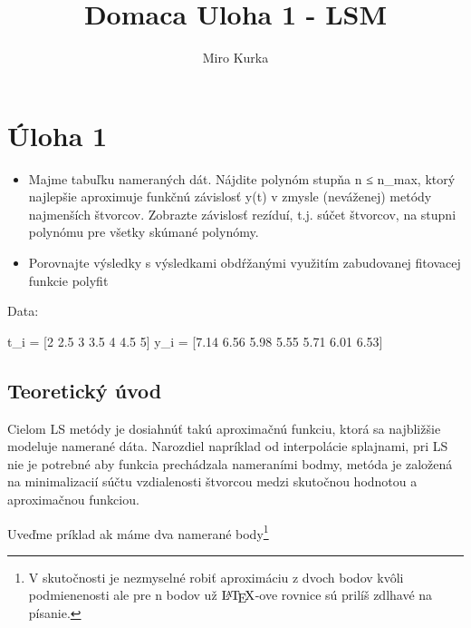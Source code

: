 \documentclass[11pt]{article}
\title{Domaca Uloha 1 - LSM}
\author{Miro Kurka}
\newenvironment{Shaded}{}{}
\newcommand{\DecValTok}[1]{\textcolor[rgb]{0.25,0.63,0.44}{{#1}}}
\newcommand{\FloatTok}[1]{\textcolor[rgb]{0.25,0.63,0.44}{{#1}}}
\newcommand{\NormalTok}[1]{{#1}}
\newcommand{\OperatorTok}[1]{\textcolor[rgb]{0.40,0.40,0.40}{{#1}}}
\let\Oldlatex\LaTeX
\renewcommand{\LaTeX}{\textrm{\Oldlatex}}
\begin{document}
    
    \maketitle
    
    

    
    \hypertarget{uxfaloha-1}{%
\section{Úloha 1}\label{uxfaloha-1}}

\begin{itemize}
\item
  Majme tabuľku nameraných dát. Nájdite polynóm stupňa n ≤ n\_max, ktorý
  najlepšie aproximuje funkčnú závislosť y(t) v zmysle (neváženej)
  metódy najmenších štvorcov. Zobrazte závislosť rezíduí, t.j. súčet
  štvorcov, na stupni polynómu pre všetky skúmané polynómy.
\item
  Porovnajte výsledky s výsledkami obdŕžanými využitím zabudovanej
  fitovacej funkcie polyfit
\end{itemize}

Data:

\begin{Shaded}
\begin{Highlighting}[]
\NormalTok{t\_i }\OperatorTok{=}\NormalTok{ [}\DecValTok{2} \FloatTok{2.5} \DecValTok{3} \FloatTok{3.5} \DecValTok{4} \FloatTok{4.5} \DecValTok{5}\NormalTok{]}
\NormalTok{y\_i }\OperatorTok{=}\NormalTok{ [}\FloatTok{7.14} \FloatTok{6.56} \FloatTok{5.98} \FloatTok{5.55} \FloatTok{5.71} \FloatTok{6.01} \FloatTok{6.53}\NormalTok{]}
\end{Highlighting}
\end{Shaded}

    \hypertarget{teoretickuxfd-uxfavod}{%
\subsection{Teoretický úvod}\label{teoretickuxfd-uxfavod}}

Cielom LS metódy je dosiahnúť takú aproximačnú funkciu, ktorá sa
najbližšie modeluje namerané dáta. Narozdiel napríklad od interpolácie
splajnami, pri LS nie je potrebné aby funkcia prechádzala nameraními
bodmy, metóda je založená na minimalizacií súčtu vzdialenosti štvorcou
medzi skutočnou hodnotou a aproximačnou funkciou.

Uveďme príklad ak máme dva namerané body\footnote{V skutočnosti je
  nezmyselné robiť aproximáciu z dvoch bodov kvôli podmienenosti ale pre
  n bodov už \(\LaTeX\)-ove rovnice sú prilíš zdlhavé na písanie.}
\end{document}
